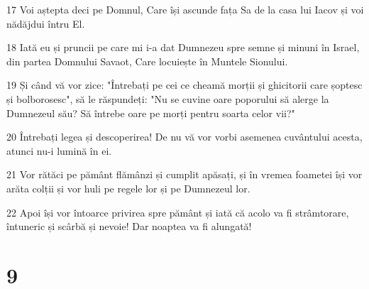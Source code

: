 \par 17 Voi aștepta deci pe Domnul, Care își ascunde fața Sa de la casa lui Iacov și voi nădăjdui întru El.
\par 18 Iată eu și pruncii pe care mi i-a dat Dumnezeu spre semne și minuni în Israel, din partea Domnului Savaot, Care locuiește în Muntele Sionului.
\par 19 Și când vă vor zice: "Întrebați pe cei ce cheamă morții și ghicitorii care șoptesc și bolborosesc", să le răspundeți: "Nu se cuvine oare poporului să alerge la Dumnezeul său? Să întrebe oare pe morți pentru soarta celor vii?"
\par 20 Întrebați legea și descoperirea! De nu vă vor vorbi asemenea cuvântului acesta, atunci nu-i lumină în ei.
\par 21 Vor rătăci pe pământ flămânzi și cumplit apăsați, și în vremea foametei își vor arăta colții și vor huli pe regele lor și pe Dumnezeul lor.
\par 22 Apoi își vor întoarce privirea spre pământ și iată că acolo va fi strâmtorare, întuneric și scârbă și nevoie! Dar noaptea va fi alungată!

\chapter{9}

